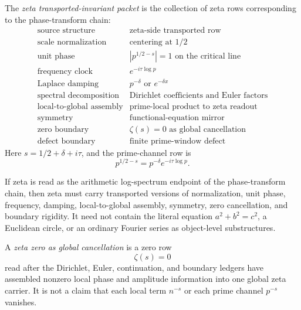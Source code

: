 \begin{definition}
\label{def:unified-reality-zeta-transported-invariant-packet}
The \emph{zeta transported-invariant packet} is the collection of zeta
rows corresponding to the phase-transform chain:
$$
\begin{array}{c|c}
\text{source structure} & \text{zeta-side transported row}\\
\hline
\text{scale normalization} & \text{centering at }1/2\\
\text{unit phase} & |p^{1/2-s}|=1\text{ on the critical line}\\
\text{frequency clock} & e^{-i\tau\log p}\\
\text{Laplace damping} & p^{-\delta}\text{ or }e^{-\delta x}\\
\text{spectral decomposition} & \text{Dirichlet coefficients and Euler factors}\\
\text{local-to-global assembly} & \text{prime-local product to zeta readout}\\
\text{symmetry} & \text{functional-equation mirror}\\
\text{zero boundary} & \zeta(s)=0\text{ as global cancellation}\\
\text{defect boundary} & \text{finite prime-window defect}
\end{array}
$$
Here $s=1/2+\delta+i\tau$, and the prime-channel row is
$$
p^{1/2-s}=p^{-\delta}e^{-i\tau\log p}.
$$
\end{definition}

\begin{principle}
\label{prin:unified-reality-zeta-inherits-transported-invariants}
If zeta is read as the arithmetic log-spectrum endpoint of the
phase-transform chain, then zeta must carry transported versions of
normalization, unit phase, frequency, damping, local-to-global assembly,
symmetry, zero cancellation, and boundary rigidity. It need not contain
the literal equation $a^2+b^2=c^2$, a Euclidean circle, or an ordinary
Fourier series as object-level substructures.
\end{principle}

\begin{definition}
\label{def:unified-reality-zeta-zero-global-cancellation}
A \emph{zeta zero as global cancellation} is a zero row
$$
\zeta(s)=0
$$
read after the Dirichlet, Euler, continuation, and boundary ledgers have
assembled nonzero local phase and amplitude information into one global
zeta carrier. It is not a claim that each local term $n^{-s}$ or each
prime channel $p^{-s}$ vanishes.
\end{definition}

